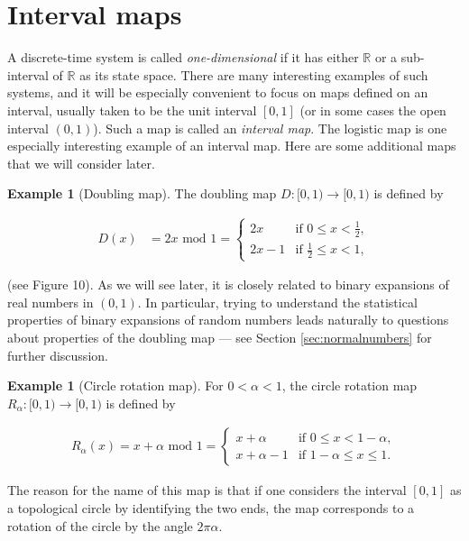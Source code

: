 \documentclass[11pt]{report}
\theoremstyle{plain}
\theoremstyle{definition}
\newtheorem{example}[thm]{Example}
\begin{document}
\section{Interval maps}

A discrete-time system is called \emph{one-dimensional} if
it has either $\mathbb{R}$ or a sub-interval of
$\mathbb{R}$ as its state space. There are many
interesting examples of such systems, and it will be
especially convenient to focus on maps defined on an
interval, usually taken to be the unit interval
$[0,1]$ (or in some cases the open interval $(0,1)$).
Such a map is called an \emph{interval map}. The logistic
map is one especially interesting example of an
interval map. Here are some additional maps that we
will consider later.

\begin{example}[Doubling map]
The doubling map $D:[0,1)\to[0,1)$ is defined by

\begin{align*}
D(x) &= 2x \textrm{ mod } 1 = \begin{cases}
2x & \textrm{if }0\le x<\tfrac12, \\ 2x-1 & \textrm{if }\tfrac12 \le x < 1,
\end{cases}
\end{align*}

\noindent (see Figure 10). As we will see later, it is closely
related to binary expansions of real numbers in
$(0,1)$. In particular, trying to understand the
statistical properties of binary expansions of random
numbers leads naturally to questions about properties
of the doubling map --- see Section
\ref{sec:normalnumbers} for further discussion.
\end{example}

\begin{example}[Circle rotation map]
For $0<\alpha<1$, the circle rotation map
$R_\alpha:[0,1)\to[0,1)$ is defined by

\begin{align*}
R_\alpha(x) = x+\alpha\textrm{ mod }1
= \begin{cases}
x+\alpha & \textrm{if }0\le x<1-\alpha, \\
x+\alpha-1 & \textrm{if } 1-\alpha \le x\le 1.
\end{cases}
\end{align*}

\noindent The reason for the name of this map is that if one
considers the interval $[0,1]$ as a topological circle
by identifying the two ends, the map corresponds to a
rotation of the circle by the angle $2\pi \alpha$.
\end{example}
\end{document}
